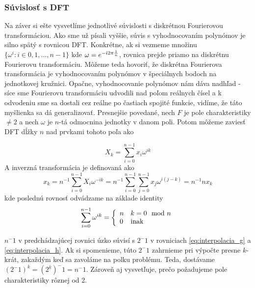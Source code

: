 \subsubsection{Súvislosť s DFT}
Na záver si ešte vysvetlíme jednotlivé súvislosti s diskrétnou
Fourierovou transformáciou. Ako sme už písali vyššie, súvis
s vyhodnocovaním polynómov je silno spätý s rovnicou DFT.
Konkrétne, ak si vezmeme množinu 
$\{ \omega^i: i \in 0,1,\dots,n-1\}$ kde $\omega = e^{-\hat{\imath} 2 \pi
\frac{1}{n}}$, rovnica  prejde priamo na diskrétnu Fourierovu
transformáciu. Môžeme teda hovoriť, že diskrétna Fourierova
transformácia je vyhodnocovaním polynómov v špeciálnych bodoch na
jednotkovej kružnici. Opačne, vyhodnocovanie polynómov nám dáva
nadhľad - síce sme Fourierovu transformáciu udvodili nad poľom
reálnych čísel a k odvodeniu sme sa dostali cez reálne po častiach
spojité funkcie, vidíme, že táto myšlienka sa dá generalizovať.
Presnejšie povedané, nech $F$ je pole charakteristiky $\not=2$ a nech
$\omega$ je $n$-tá odmocnina jednotky v danom poli.
Potom môžeme zaviesť DFT dĺžky $n$ nad prvkami tohoto poľa ako

\begin{equation}
    X_k = \sum_{i=0}^{n-1} x_i \omega^{ik}
\end{equation}
A inverzná transformácia je definovaná ako
\begin{equation}
    x_k = n^{-1} \sum_{i=0}^{n-1} X_i \omega^{-ik}
        = n^{-1} \sum_{i=0}^{n-1} \sum_{j=0}^{n-1} 
            x_j \omega^{i(j-k)}
        = n^{-1} n x_k
\end{equation}
kde poslednú rovnosť odvádzame na základe identity
\begin{equation}
    \sum_{i=0}^{n-1} \omega^{ik} = \left\{
        \begin{array}{l l}
            n& k=0 \mod n\\
            0& \text{inak}
        \end{array}
        \right.
\end{equation}
\begin{poznamka}
    $n^-1$ v predchádzajúcej rovnici úzko súvisí s $2^-1$ v rovniciach
    \ref{eq:interpolacia_g} a \ref{eq:interpolacia_h}. Ak si
    spomenieme, túto $2^-1$ zahrnieme pri výpočte presne $k$-krát,
    zakaždým keď sa zavoláme na polku problému. Teda, dostávame
    $(2^-1)^k = (2^k)^-1 = n^-1$. Zároveň aj vysvetľuje, prečo
    požadujeme pole charakteristiky rôznej od 2.
\end{poznamka}

\nocite{pollard}
\nocite{compalg}
\nocite{practical_fast_multiplication}
